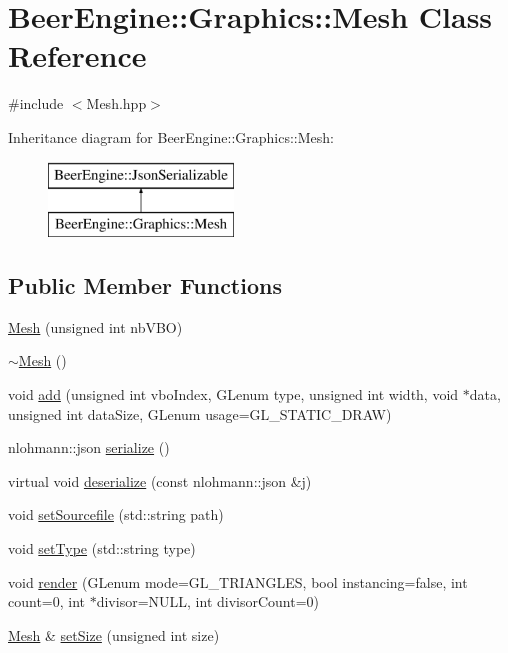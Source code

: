 \hypertarget{class_beer_engine_1_1_graphics_1_1_mesh}{}\section{Beer\+Engine\+:\+:Graphics\+:\+:Mesh Class Reference}
\label{class_beer_engine_1_1_graphics_1_1_mesh}


{\ttfamily \#include $<$Mesh.\+hpp$>$}

Inheritance diagram for Beer\+Engine\+:\+:Graphics\+:\+:Mesh\+:\begin{figure}[H]
\begin{center}
\leavevmode
\includegraphics[height=2.000000cm]{class_beer_engine_1_1_graphics_1_1_mesh}
\end{center}
\end{figure}
\subsection*{Public Member Functions}
\begin{DoxyCompactItemize}
\item 
\mbox{\hyperlink{class_beer_engine_1_1_graphics_1_1_mesh_ae159a28de064d54eb46449409fc9fe4c}{Mesh}} (unsigned int nb\+V\+BO)
\item 
\mbox{\hyperlink{class_beer_engine_1_1_graphics_1_1_mesh_a431d1ff7416183e410ffd9b7de1bace3}{$\sim$\+Mesh}} ()
\item 
void \mbox{\hyperlink{class_beer_engine_1_1_graphics_1_1_mesh_a72b23ade4bb8777ff85c36c0e0920725}{add}} (unsigned int vbo\+Index, G\+Lenum type, unsigned int width, void $\ast$data, unsigned int data\+Size, G\+Lenum usage=G\+L\+\_\+\+S\+T\+A\+T\+I\+C\+\_\+\+D\+R\+AW)
\item 
nlohmann\+::json \mbox{\hyperlink{class_beer_engine_1_1_graphics_1_1_mesh_a2bdd2912e84c9e2d686bdad2dbf6ec9e}{serialize}} ()
\item 
virtual void \mbox{\hyperlink{class_beer_engine_1_1_graphics_1_1_mesh_a888ed58ac7ecc446be640f7fe5f546ee}{deserialize}} (const nlohmann\+::json \&j)
\item 
void \mbox{\hyperlink{class_beer_engine_1_1_graphics_1_1_mesh_a9c0d91380cd84b6850e850ed9b4d61ed}{set\+Sourcefile}} (std\+::string path)
\item 
void \mbox{\hyperlink{class_beer_engine_1_1_graphics_1_1_mesh_a296b58a337dab85843a69f1dced68125}{set\+Type}} (std\+::string type)
\item 
void \mbox{\hyperlink{class_beer_engine_1_1_graphics_1_1_mesh_a450ceb1ed5555ad5f57f29700a1d5311}{render}} (G\+Lenum mode=G\+L\+\_\+\+T\+R\+I\+A\+N\+G\+L\+ES, bool instancing=false, int count=0, int $\ast$divisor=N\+U\+LL, int divisor\+Count=0)
\item 
\mbox{\hyperlink{class_beer_engine_1_1_graphics_1_1_mesh}{Mesh}} \& \mbox{\hyperlink{class_beer_engine_1_1_graphics_1_1_mesh_ad149bbda494d7043fe49de9571534f03}{set\+Size}} (unsigned int size)
\end{DoxyCompactItemize}
